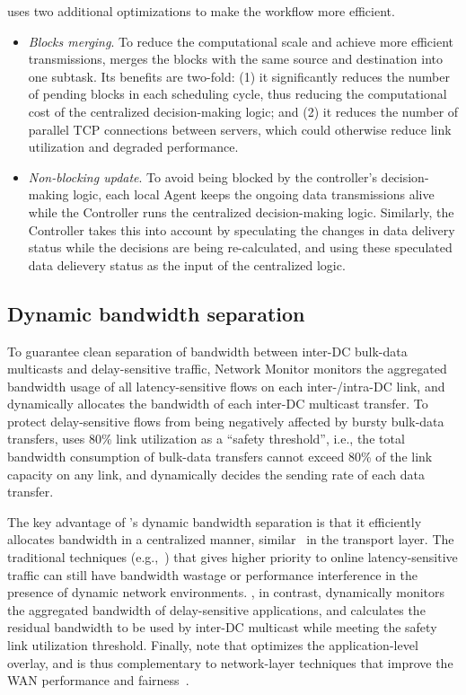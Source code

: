 \name uses two additional optimizations to make the workflow
more efficient.
\begin{itemize}
\item \emph{Blocks merging}.
To reduce the computational scale and achieve more efficient
transmissions, \name merges the blocks with the same source and
destination into one subtask. Its benefits are two-fold: (1) it
significantly reduces the number of pending blocks in each
scheduling cycle, thus reducing the computational cost of the
centralized decision-making logic; and (2) it reduces the number
of parallel TCP connections between servers, which could
otherwise reduce link utilization and degraded performance.
\item \emph{Non-blocking update}.
To avoid being blocked by the controller's decision-making logic, 
each local Agent  keeps the ongoing data transmissions alive while 
the Controller runs the centralized decision-making logic. 
Similarly, the Controller takes this into account by speculating 
the changes in data delivery status while the decisions are being 
re-calculated, and using these speculated data delievery status as
the input of the centralized logic.
\end{itemize}

\subsection{Dynamic bandwidth separation}
\label{subsec:system:separation}

To guarantee clean separation of bandwidth between inter-DC
bulk-data multicasts and delay-sensitive traffic, \name Network
Monitor monitors the aggregated bandwidth usage of all
latency-sensitive flows on each inter-/intra-DC link, and
dynamically allocates the bandwidth of each inter-DC multicast
transfer. To protect delay-sensitive flows from being negatively 
affected by bursty bulk-data transfers, \name uses 80\% link 
utilization as a ``safety threshold'', i.e., the total bandwidth 
consumption of bulk-data transfers cannot exceed 80\% of the link 
capacity on any link, and dynamically decides the sending rate 
of each data transfer.

The key advantage of \name's dynamic bandwidth separation is that it 
efficiently allocates bandwidth in a centralized manner, 
similar~\cite{kumar2015bwe} in the transport layer. The traditional 
techniques (e.g.,~\cite{kumar2015bwe}) that gives higher priority to 
online latency-sensitive traffic can still have bandwidth wastage or 
performance interference in the presence of dynamic network 
environments. \name, in contrast, dynamically monitors the aggregated 
bandwidth of delay-sensitive applications, and calculates the 
residual bandwidth to be used by inter-DC multicast while meeting the
safety link utilization threshold. Finally, note that \name optimizes 
the application-level overlay, and is thus complementary to 
network-layer techniques that improve the WAN performance and 
fairness~\cite{chen2012design, kavulya2010analysis, mishra2010towards, reiss2012heterogeneity}.


